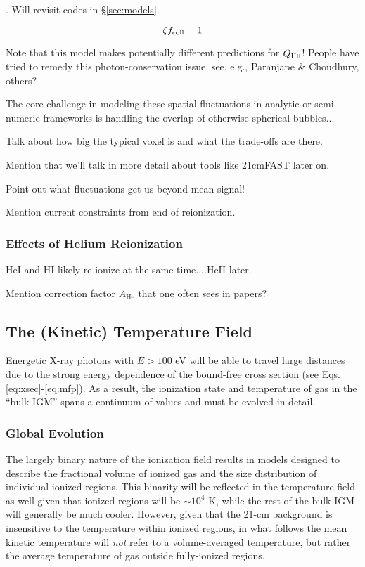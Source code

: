 \cite{Furlanetto2004}. Will revisit codes in \S\ref{sec:models}.

\begin{equation}
	\zeta f_{\text{coll}} = 1
\end{equation}


Note that this model makes potentially different predictions for $Q_{\text{H} {\textsc{ii}}}$! People have tried to remedy this photon-conservation issue, see, e.g., Paranjape \& Choudhury, others?


The core challenge in modeling these spatial fluctuations in analytic or semi-numeric frameworks is handling the overlap of otherwise spherical bubbles...


Talk about how big the typical voxel is and what the trade-offs are there.


Mention that we'll talk in more detail about tools like 21cmFAST later on.

Point out what fluctuations get us beyond mean signal!


Mention current constraints from end of reionization.


\subsubsection{Effects of Helium Reionization}
HeI and HI likely re-ionize at the same time....HeII later.

Mention correction factor $A_{\mathrm{He}}$ that one often sees in papers?

\subsection{The (Kinetic) Temperature Field}
Energetic X-ray photons with $E > 100$ eV will be able to travel large distances due to the strong energy dependence of the bound-free cross section (see Eqs. \ref{eq:xsec}-\ref{eq:mfp}). As a result, the ionization state and temperature of gas in the ``bulk IGM'' spans a continuum of values and must be evolved in detail. 

\subsubsection{Global Evolution} \label{sec:temperature_global}
The largely binary nature of the ionization field results in models designed to describe the fractional volume of ionized gas and the size distribution of individual ionized regions. This binarity will be reflected in the temperature field as well given that ionized regions will be $\sim 10^4$ K, while the rest of the bulk IGM will generally be much cooler. However, given that the 21-cm background is insensitive to the temperature within ionized regions, in what follows the mean kinetic temperature will \textit{not} refer to a volume-averaged temperature, but rather the average temperature of gas outside fully-ionized regions. 

